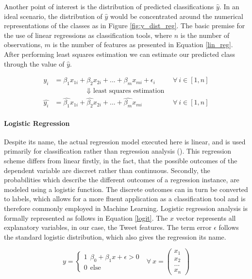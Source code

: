 		Another point of interest is the distribution of predicted classifications $\hat{y}$. In an ideal scenario, the distribution of $\hat{y}$ would be concentrated around the numerical representations of the classes as in Figure \ref{fig:y_dist_reg}. The basic premise for the use of linear regressions as classification tools, where $ n $ is the number of observations, $ m $ is the number of features as presented in Equation \ref{lin_reg}. After performing least squares estimation we can estimate our predicted class through the value of $ \hat{y} $.
	
	\begin{equation}
		\begin{aligned}
			y_i& = \beta_1 x_{1i}+ \beta_2 x_{2i} + ... + \beta_m x_{mi} + \epsilon_i \ \ \ \ \ \ \ \ 
			&\forall \ i \in [1,n] \\
			& \hspace{2cm}\Downarrow \text{  least squares estimation}& \\
			\hat{y_i}& = \hat{\beta_1} x_{1i}+ \hat{\beta_2} x_{2i} + ... + \hat{\beta_m} x_{mi} \ \ \ \ \ \ \ \ 
			&\forall \ i \in [1,n]
		\end{aligned}
		\label{lin_reg}
	\end{equation}
	
	\paragraph{Logistic Regression} Despite its name, the actual regression model executed here is linear, and is used primarily for classification rather than regression analysis (\cite{bishop2006logistic}). This regression scheme differs from linear firstly, in the fact, that the possible outcomes of the dependent variable are discreet rather than continuous. Secondly, the probabilities which describe the different outcomes of a regression instance, are modeled using a logistic function. The discrete outcomes can in turn be converted to labels, which allows for a more fluent application as a classification tool and is therefore commonly employed in  Machine Learning. Logistic regression analysis is formally represented as follows in Equation \ref{logit}. The $x$ vector represents all explanatory variables, in our case, the Tweet features. The term error $\epsilon$ follows the standard logistic distribution, which also gives the regression its name. 
	
	\begin{equation}
		y = 
		\begin{cases}
		1 \ \  \beta_0 + \beta_1 x + \epsilon > 0 \\
		0 \ \  \text{else } 
		\end{cases} \text{         } \forall \  x = 
		\begin{pmatrix}x_1\\x_2\\...\\x_n \end{pmatrix}
		\label{logit}
	\end{equation}